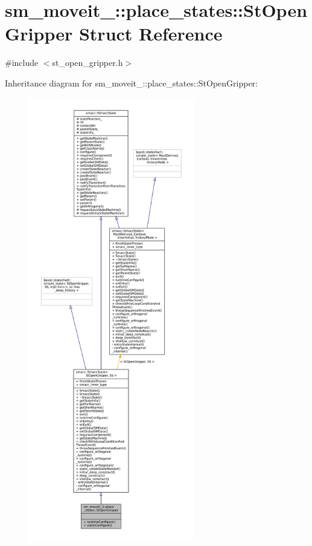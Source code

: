\hypertarget{structsm__moveit__2_1_1place__states_1_1StOpenGripper}{}\section{sm\+\_\+moveit\+\_\+:\+:place\+\_\+states\+:\+:St\+Open\+Gripper Struct Reference}
\label{structsm__moveit__2_1_1place__states_1_1StOpenGripper}


{\ttfamily \#include $<$st\+\_\+open\+\_\+gripper.\+h$>$}



Inheritance diagram for sm\+\_\+moveit\+\_\+:\+:place\+\_\+states\+:\+:St\+Open\+Gripper\+:
\nopagebreak
\begin{figure}[H]
\begin{center}
\leavevmode
\includegraphics[height=550pt]{structsm__moveit__2_1_1place__states_1_1StOpenGripper__inherit__graph}
\end{center}
\end{figure}


